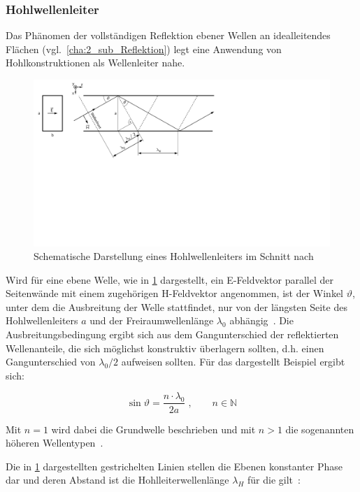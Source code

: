 \subsubsection{Hohlwellenleiter}\label{cha:2_subsub_Hohlwellenleiter}
Das Phänomen der vollständigen Reflektion ebener Wellen an idealleitendes Flächen (vgl.~\Abschnitt\ref{cha:2_sub_Reflektion}) legt eine Anwendung von Hohlkonstruktionen als Wellenleiter nahe. 
\par
\vspace{\linespace}
\begin{figure}
    \centering
    \includegraphics[scale = 1, trim = 0cm 10cm 13cm 0cm, clip, width=.8\textwidth]{Abbildungen/Kapitel2/Hohlwellenleiter.pdf}
    \caption[Schematische Darstellung eines Hohlwellenleiters im Schnitt]{Schematische Darstellung eines Hohlwellenleiters im Schnitt nach~\cite{Taschenbuch_HF-Technik}}
    \label{fig:2_Hohlwellenleiter}
\end{figure}

Wird für eine ebene Welle, wie in \Abb\ref{fig:2_Hohlwellenleiter} dargestellt, ein E-Feldvektor parallel der Seitenwände mit einem zugehörigen H-Feldvektor angenommen, ist der Winkel $\vartheta$, unter dem die Ausbreitung der Welle stattfindet, nur von der längsten Seite des Hohlwellenleiters $a$ und der Freiraumwellenlänge $\lambda_0$ abhängig~\cite{Taschenbuch_HF-Technik}. Die Ausbreitungsbedingung ergibt sich aus dem Gangunterschied der reflektierten Wellenanteile, die sich möglichst konstruktiv überlagern sollten, d.h. einen Gangunterschied von $\lambda_0 / 2$ aufweisen sollten. Für das dargestellt Beispiel ergibt sich: 

\begin{equation}
    \sin{\vartheta} = \frac{n \cdot \lambda_0}{2 a} \; , \qquad n \in \mathbb{N}
\end{equation}
 
Mit $n=1$ wird dabei die Grundwelle beschrieben und mit $n>1$ die sogenannten höheren Wellentypen~\cite{Taschenbuch_HF-Technik}.
\par
\vspace{\linespace}
Die in  \Abb\ref{fig:2_Hohlwellenleiter} dargestellten gestrichelten Linien stellen die Ebenen konstanter Phase dar und deren Abstand ist die Hohlleiterwellenlänge $\lambda_H$ für die gilt~\cite{Taschenbuch_HF-Technik}:

